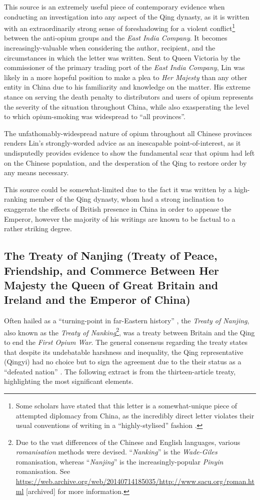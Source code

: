 \documentclass{article}
\begin{document}
This source is an extremely useful piece of contemporary evidence when conducting an investigation into any aspect of the Qing dynasty, as it is written with an extraordinarily strong sense of foreshadowing for a violent conflict\footnote{Some scholars have stated that this letter is a somewhat-unique piece of attempted diplomacy from China, as the incredibly direct letter violates their usual conventions of writing in a ``highly-stylised'' fashion
\autocite{Kishlansky:1995}.} between the anti-opium groups and the \textit{East India Company}. It becomes increasingly-valuable when considering the author, recipient, and the circumstances in which the letter was written. Sent to Queen Victoria by the commissioner of the primary trading port of the \textit{East India Company}, Lin was likely in a more hopeful position to make a plea to \textit{Her Majesty} than any other entity in China due to his familiarity and knowledge on the matter. His extreme stance on serving the death penalty to distributors and users of opium represents the severity of the situation throughout China, while also exasperating the level to which opium-smoking was widespread to ``all provinces''.

The unfathomably-widespread nature of opium throughout all Chinese provinces renders Lin's strongly-worded advice as an inescapable point-of-interest, as it undisputedly provides evidence to show the fundamental scar that opium had left on the Chinese population, and the desperation of the Qing to restore order by any means necessary.

This source could be somewhat-limited due to the fact it was written by a high-ranking member of the Qing dynasty, whom had a strong inclination to exaggerate the effects of British presence in China in order to appease the Emperor, however the majority of his writings are known to be factual to a rather striking degree.

\subsection{The Treaty of Nanjing (Treaty of Peace, Friendship, and Commerce Between Her Majesty the Queen of Great Britain and Ireland and the Emperor of China)}

Often hailed as a ``turning-point in far-Eastern history''
\autocite{Fairbank:1940}, the \textit{Treaty of Nanjing}, also known as the \textit{Treaty of Nanking}\footnote{Due to the vast differences of the Chinese and English languages, various \textit{romanisation} methods were devised. ``\textit{Nanking}'' is the \textit{Wade-Giles} romanisation, whereas ``\textit{Nanjing}'' is the increasingly-popular \textit{Pinyin} romanisation. See \url{https://web.archive.org/web/20140714185035/http://www.sacu.org/roman.html} [archived] for more information.}, was a treaty between Britain and the Qing to end the \textit{First Opium War}. The general consensus regarding the treaty states that despite its undebatable harshness and inequality, the Qing representative (Qingyi) had no choice but to sign the agreement due to the their status as a ``defeated nation''
\autocite{Mao:2018}. The following extract is from the thirteen-article treaty, highlighting the most significant elements.
\end{document}
